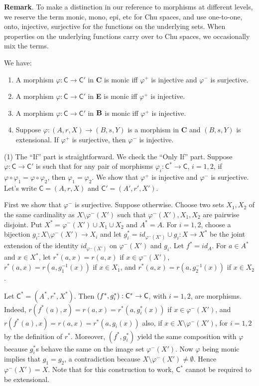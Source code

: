 \documentclass{LMCS}
\let\pf\proof
\begin{document}
{\bf Remark}. To make a distinction in our reference to
morphisms at different levels, we reserve the term monic, mono, epi, etc for
Chu spaces, and use one-to-one, onto, injective, surjective for the functions
on the underlying sets. When properties on the underlying functions carry over to
Chu spaces, we occasionally mix the terms.

\begin{prop}\label{CB} We have:
\begin{enumerate}[\em(1)]
\item A morphism $\varphi: \mathsf{C}\to \mathsf{C}'$ in {\bf C} is monic  iff
$\varphi^+$ is injective and $\varphi^-$ is surjective.
\item A morphism $\varphi: \mathsf{C}\to \mathsf{C}'$ in {\bf E} is monic  iff
$\varphi^+$ is injective.
\item A morphism  $\varphi: \mathsf{C}\to \mathsf{C}'$ in ${\bf B}$ is monic  iff
$\varphi^+$ is injective.
\item Suppose $\varphi: (A, r, X)\to (B, s, Y)$ is a
morphism in  {\bf C} and $(B, s, Y)$ is extensional.
If $\varphi^+$ is surjective, then $\varphi^-$ is injective.
\end{enumerate}
\end{prop}

\pf
(1) The ``If'' part is straightforward. We check the ``Only If'' part. 
Suppose $\varphi : \mathsf{C}\to \mathsf{C}'$ is such that for any pair of
morphisms $\varphi_i : \mathsf{C}^* \to \mathsf{C}$, $i=1,2$, if $\varphi
\circ \varphi_1 = \varphi \circ \varphi_2$, then $\varphi_1 =
\varphi_2$.  We show that $\varphi^+$ is injective and $\varphi^-$ is
surjective.  Let's write $\mathsf{C}=(A, r, X)$ and $\mathsf{C}'=(A', r',
X')$. 



First we show that $\varphi^-$ is surjective. Suppose otherwise. 
Choose two sets $X_1, X_2$ of the same cardinality as $X \setminus
\varphi^-(X')$ such that $\varphi^-(X'), X_1, X_2$ are pairwise
disjoint.  Put $X^* = \varphi^-(X') \cup X_1 \cup X_2$ and $A^* = A$. 
For $i = 1,2$, choose a bijection $g_i: X \setminus \varphi^-(X') \to
X_i$ and let $g_i^* = id_{\varphi^-(X')}\cup g_i: X \to X^*$ be the
joint extension of the identity $id_{\varphi^-(X')}$ on $
\varphi^-(X')$ and $g_i$.  Let $f^* = id_A$.  For $a \in A^*$ and $x
\in X^*$, let $r^* (a, x) = r(a,x)$ if $x\in \varphi^-(X')$, $r^* (a,
x) = r(a, g_1^{-1}(x))$ if $x\in X_1$, and $r^* (a, x) = r(a,
g_2^{-1}(x))$ if $x\in X_2$. 

Let $\mathsf{C}^* = (A^*,r^*,X^*)$. Then $(f^*,g_i^*): \mathsf{C}^* \to {\sf
  C} $, with $i = 1,2$, are morphisms.  Indeed, $r(f^*(a), x) = r(a,
x) = r^*(a, g^*_i(x))$ if $x\in \varphi^-(X')$, and $r(f^*(a), x) = r(a,
x) = r^*(a, g_i(x))$ also, if $x\in X\setminus \varphi^-(X')$, for
$i=1,2$ by the definition of $r^*$.  Moreover, $(f^*,g_i^*)$ yield the
same composition with $\varphi$ because $g_i^*$s behave the same on
the image set $\varphi^-(X')$.  Now $\varphi$ being monic implies that
$g_1 = g_2$, a contradiction because $X \setminus \varphi^- (X') \ne
\emptyset$. Hence $\varphi^- (X') = X$.  Note that for this
construction to work, $\mathsf{C}^*$ cannot be required to be
extensional. 
\end{document}

